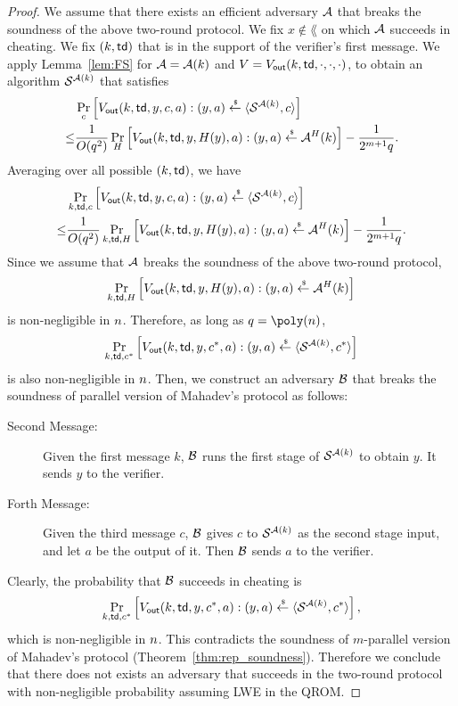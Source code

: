 \begin{proof}
We assume that there exists an efficient adversary $\mathcal{A}$ that breaks the soundness of the above two-round protocol.
We fix $x\notin \lang$ on which $\mathcal{A}$ succeeds in cheating.
We fix $(k,\mathsf{td})$ that is in the support of the verifier's first message.
We apply Lemma~\ref{lem:FS} for $\mathcal{A}=\mathcal{A}(k)$ and $V=V_{\mathsf{out}}(k,\mathsf{td},\cdot,\cdot,\cdot)$, to obtain an algorithm $\mathcal{S}^{\mathcal{A}(k)}$ that satisfies
\begin{align*}
    &\Pr_{c}\left[V_{\mathsf{out}}(k,\mathsf{td},y,c,a):(y,a)\overset{\hspace{0.1em}\mathsf{\scriptscriptstyle\$}}{\leftarrow} \langle\mathcal{S}^{\mathcal{A}(k)},c \rangle \right]\\
    \leq &\frac{1}{O(q^2)}\Pr_{H}\left[V_{\mathsf{out}}(k,\mathsf{td},y,H(y),a):(y,a)\overset{\hspace{0.1em}\mathsf{\scriptscriptstyle\$}}{\leftarrow} \mathcal{A}^H(k)\right]-\frac{1}{2^{m+1}q}.
\end{align*}
Averaging over all possible $(k,\mathsf{td})$, we have
\begin{align*}
    &\Pr_{k,\mathsf{td},c}\left[V_{\mathsf{out}}(k,\mathsf{td},y,c,a):(y,a)\overset{\hspace{0.1em}\mathsf{\scriptscriptstyle\$}}{\leftarrow} \langle\mathcal{S}^{\mathcal{A}(k)},c \rangle \right]\\
    \leq &\frac{1}{O(q^2)}\Pr_{k,\mathsf{td},H}\left[V_{\mathsf{out}}(k,\mathsf{td},y,H(y),a):(y,a)\overset{\hspace{0.1em}\mathsf{\scriptscriptstyle\$}}{\leftarrow} \mathcal{A}^H(k)\right]-\frac{1}{2^{m+1}q}.
\end{align*}
Since we assume that $\mathcal{A}$ breaks the soundness of the above two-round protocol,
\[
\Pr_{k,\mathsf{td},H}\left[V_{\mathsf{out}}(k,\mathsf{td},y,H(y),a):(y,a)\overset{\hspace{0.1em}\mathsf{\scriptscriptstyle\$}}{\leftarrow} \mathcal{A}^H(k)\right]
\]
is non-negligible in $n$.
Therefore, as long as $q=\poly(\secpar)$, 
\[
\Pr_{k,\mathsf{td},c^*}\left[V_{\mathsf{out}}(k,\mathsf{td},y,c^*,a):(y,a)\overset{\hspace{0.1em}\mathsf{\scriptscriptstyle\$}}{\leftarrow} \langle\mathcal{S}^{\mathcal{A}(k)},c^* \rangle \right]\]
is also non-negligible in $n$.
Then, we construct an adversary $\mathcal{B}$ that breaks the soundness of parallel version of Mahadev's protocol as follows:
\begin{description}
\item[Second Message:] Given the first message $k$, $\mathcal{B}$ runs the first stage of $\mathcal{S}^{\mathcal{A}(k)}$ to obtain $y$. It sends $y$ to the verifier.
\item[Forth Message:] Given the third message $c$, $\mathcal{B}$ gives $c$ to $\mathcal{S}^{\mathcal{A}(k)}$ as the second stage input, and let $a$ be the output of it.
Then $\mathcal{B}$ sends $a$ to the verifier.
\end{description}
Clearly, the probability that $\mathcal{B}$ succeeds in cheating is 
\[
\Pr_{k,\mathsf{td},c^*}\left[V_{\mathsf{out}}(k,\mathsf{td},y,c^*,a):(y,a)\overset{\hspace{0.1em}\mathsf{\scriptscriptstyle\$}}{\leftarrow} \langle\mathcal{S}^{\mathcal{A}(k)},c^* \rangle \right],\]
which is non-negligible in $n$.
This contradicts the soundness of $m$-parallel version of Mahadev's protocol (Theorem~\ref{thm:rep_soundness}).
Therefore we conclude that there does not exists an adversary that succeeds in the two-round protocol with non-negligible probability assuming LWE in the QROM.
\end{proof}